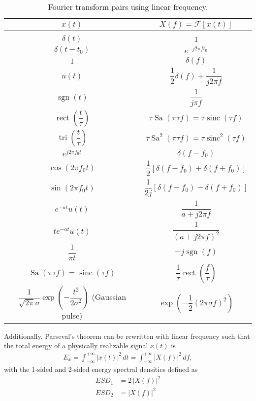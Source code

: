 \documentclass{report}
\begin{document}
\begin{table}[!hbt]
    \centering
    \caption{Fourier transform pairs using linear frequency.}
    \label{linear_fourier_pairs}
    \begin{tabular}{|c|c|}
        \hline
        $x(t)$ & $X(f)=\mathcal{F}[x(t)]$ \\[0.15cm]
        \hline
        & \\[0.1cm]
        $\delta(t)$ & $1$ \\[0.5cm]
        $\delta(t-t_0)$ & $e^{-j2\pi ft_0}$ \\[0.5cm]
        $1$ & $\delta(f)$ \\[0.5cm]
        $u(t)$ & $\dfrac{1}{2}\delta(f) + \dfrac{1}{j2\pi f}$ \\[0.5cm]
        $\operatorname{sgn}(t)$ & $\dfrac{1}{j\pi f}$ \\[0.5cm]
        $\operatorname{rect}\left(\dfrac{t}{\tau}\right)$ & $\tau\operatorname{Sa}(\pi\tau f) = \tau\operatorname{sinc}(\tau f)$ \\[0.5cm]
        $\operatorname{tri}\left(\dfrac{t}{\tau}\right)$ & $\tau\operatorname{Sa}^2(\pi\tau f) = \tau\operatorname{sinc}^2(\tau f)$ \\[0.5cm]
        $e^{j2\pi f_0 t}$ & $\delta(f-f_0)$ \\[0.5cm]
        $\cos(2\pi f_0 t)$ & $\dfrac{1}{2}[\delta(f-f_0) + \delta(f+f_0)]$ \\[0.5cm]
        $\sin(2\pi f_0 t)$ & $\dfrac{1}{2j}[\delta(f-f_0) - \delta(f+f_0)]$ \\[0.5cm]
        $e^{-at}u(t)$ & $\dfrac{1}{a+j2\pi f}$ \\[0.5cm]
        $te^{-at}u(t)$ & $\dfrac{1}{(a+j2\pi f)^2}$ \\[0.5cm]
        $\dfrac{1}{\pi t}$ & $-j \operatorname{sgn}(f)$ \\[0.5cm]
        $\operatorname{Sa}(\pi\tau f) = \operatorname{sinc}(\tau f)$ & $\dfrac{1}{\tau}\operatorname{rect}\left(\dfrac{f}{\tau}\right)$ \\[0.5cm]
        $\dfrac{1}{\sqrt{2\pi}\sigma}\exp\left(-\dfrac{t^2}{2\sigma^2}\right)$ (Gaussian pulse) & $\exp\left(-\dfrac{1}{2}(2\pi\sigma f)^2\right)$ \\[0.5cm]
        \hline
    \end{tabular}
\end{table}
\newpage
\noindent Additionally, Parseval's theorem can be rewritten with linear frequency such that the total energy of a physically realizable signal $x(t)$ is 
\begin{align}
    E_x = \int_{-\infty}^{+\infty} |x(t)|^2 \,dt = \int_{-\infty}^{+\infty} |X(f)|^2 \,df,
\end{align}
with the 1-sided and 2-sided energy spectral densities defined as 
\begin{align*}
    ESD_1 &= 2\,|X(f)|^2 \\
    ESD_2 &= |X(f)|^2
\end{align*} 
\end{document}
